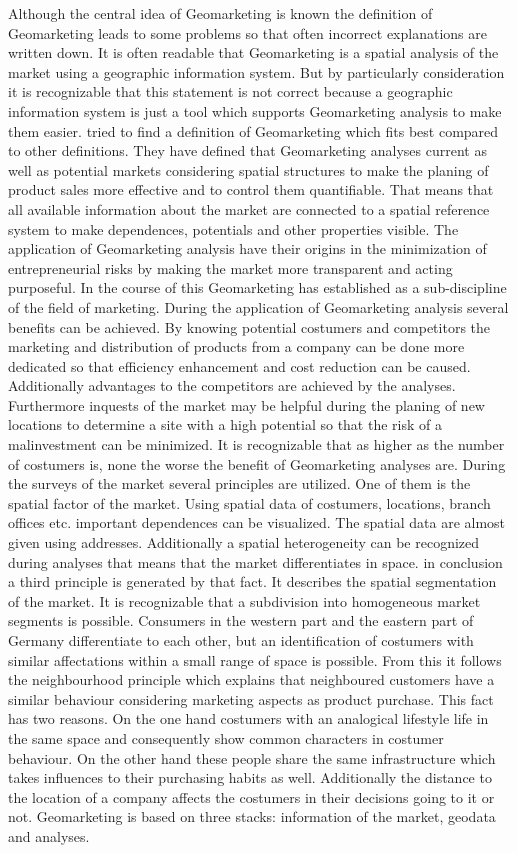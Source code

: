 Although the central idea of Geomarketing is known the definition of Geomarketing leads to some problems so that often incorrect explanations are written down. It is often readable that Geomarketing is a spatial analysis of the market using a geographic information system. But by particularly consideration it is recognizable that this statement is not correct because a geographic information system is just a tool which supports Geomarketing analysis to make them easier. \citeauthor{herter} tried to find a definition of Geomarketing which fits best compared to other definitions. They have defined that Geomarketing analyses current as well as potential markets considering spatial structures to make the planing of product sales more effective and to control them quantifiable. That means that all available information about the market are connected to a spatial reference system to make dependences, potentials and other properties visible. The application of Geomarketing analysis have their origins in the minimization of entrepreneurial risks by making the market more transparent and acting purposeful. In the course of this Geomarketing has established as a sub-discipline of the field of marketing. During the application of Geomarketing analysis several benefits can be achieved. By knowing potential costumers and competitors the marketing and distribution of products from a company can be done more dedicated so that efficiency enhancement and cost reduction can be caused. Additionally advantages to the competitors are achieved by the analyses. Furthermore inquests of the market may be helpful during the planing of new locations to determine a site with a high potential so that the risk of a malinvestment can be minimized. It is recognizable that as higher as the number of costumers is, none the worse the benefit of Geomarketing analyses are. During the surveys of the market several principles are utilized. One of them is the spatial factor of the market. Using spatial data of costumers, locations, branch offices etc. important dependences can be visualized. The spatial data are almost given using addresses. Additionally a spatial heterogeneity can be recognized during analyses that means that the market differentiates in space. in conclusion a third principle is generated by that fact. It describes the spatial segmentation of the market. It is recognizable that a subdivision into homogeneous market segments is possible. Consumers in the western part and the eastern part of Germany differentiate to each other, but an identification of costumers with similar affectations within a small range of space is possible. From this it follows the neighbourhood principle which explains that neighboured customers have a similar behaviour considering marketing aspects as product purchase. This fact has two reasons. On the one hand costumers with an analogical lifestyle life in the same space and consequently show common characters in costumer behaviour. On the other hand these people share the same infrastructure which takes influences to their purchasing habits as well. Additionally the distance to the location of a company affects the costumers in their decisions going to it or not. 
Geomarketing is based on three stacks: information of the market, geodata and analyses. 

